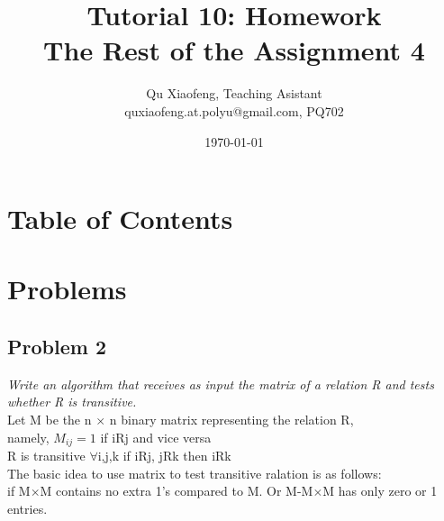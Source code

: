 \documentclass[
               handout,
               ]{beamer}
\title[Tutorial 10]{Tutorial 10: Homework \\ The Rest of the Assignment 4}
\author[COMP210]{Qu Xiaofeng\texorpdfstring{, Teaching Asistant\\\tiny{quxiaofeng.at.polyu@gmail.com, PQ702}}{}}
\institute{COMP210\\Discrete Structure}
\date{\today}
\begin{document}
\frame{\titlepage}

\section*{Table of Contents}

    \begin{frame}{\secname}
        \tableofcontents
    \end{frame}




\section{Problems}



    \subsection{Problem 2}
    
        \begin{frame}[c]{\subsecname}
            \emph{Write an algorithm that receives as input the matrix of a relation R and tests whether R is transitive.}\\$\;$\\\pause
            Let M be the n $\times$ n binary matrix representing the relation R,\\
            namely, $M_{ij}=1$ if iRj and vice versa\\
            R is transitive $\forall$i,j,k  if iRj, jRk then iRk\\
            The basic idea to use matrix to test transitive ralation is as follows:\\
            if M$\times$M contains no extra 1\rq{}s compared to M. Or M-M$\times$M has only zero or 1 entries.
        \end{frame}
        
\end{document}
